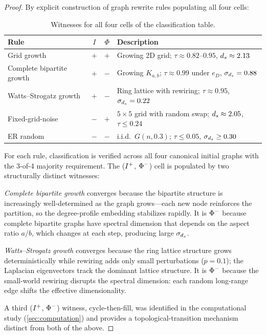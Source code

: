\documentclass{../shared/primo}
\begin{document}
\begin{proof}
By explicit construction of graph rewrite rules populating all four cells:

\begin{table}[ht]
\centering
\begin{tabular}{lccl}
\toprule
Rule & $I$ & $\Phi$ & Description \\
\midrule
Grid growth & $+$ & $+$ & Growing 2D grid; $\tau \approx 0.82\text{--}0.95$, $d_s \approx 2.13$ \\
Complete bipartite growth & $+$ & $-$ & Growing $K_{a,b}$; $\tau \approx 0.99$ under $e_D$, $\sigma_{d_s} = 0.88$ \\
Watts--Strogatz growth & $+$ & $-$ & Ring lattice with rewiring; $\tau \approx 0.95$, $\sigma_{d_s} = 0.22$ \\
Fixed-grid-noise & $-$ & $+$ & $5 \times 5$ grid with random swap; $d_s \approx 2.05$, $\tau \leq 0.24$ \\
ER random & $-$ & $-$ & i.i.d.\ $G(n, 0.3)$; $\tau \leq 0.05$, $\sigma_{d_s} \geq 0.30$ \\
\bottomrule
\end{tabular}
\caption{Witnesses for all four cells of the classification table.}
\label{tab:witnesses}
\end{table}

For each rule, classification is verified across all four canonical initial graphs with the 3-of-4 majority requirement. The ($I\textsuperscript{+}$, $\Phi\textsuperscript{$-$}$) cell is populated by two structurally distinct witnesses:

\emph{Complete bipartite growth} converges because the bipartite structure is increasingly well-determined as the graph grows---each new node reinforces the partition, so the degree-profile embedding stabilizes rapidly. It is $\Phi\textsuperscript{$-$}$ because complete bipartite graphs have spectral dimension that depends on the aspect ratio $a/b$, which changes at each step, producing large $\sigma_{d_s}$.

\emph{Watts--Strogatz growth} converges because the ring lattice structure grows deterministically while rewiring adds only small perturbations ($p = 0.1$); the Laplacian eigenvectors track the dominant lattice structure. It is $\Phi\textsuperscript{$-$}$ because the small-world rewiring disrupts the spectral dimension: each random long-range edge shifts the effective dimensionality.

A third ($I\textsuperscript{+}$, $\Phi\textsuperscript{$-$}$) witness, cycle-then-fill, was identified in the computational study (\cref{sec:computation}) and provides a topological-transition mechanism distinct from both of the above.
\end{proof}
\end{document}
